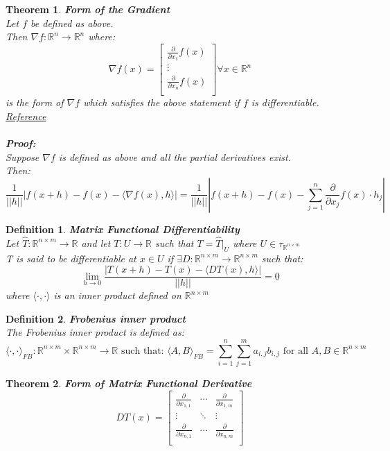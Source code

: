\documentclass[12pt]{extarticle}
\theoremstyle{plain}
\newtheorem{thm}{Theorem}[section]
\theoremstyle{plain}
\theoremstyle{Definition}
\newtheorem{def.}{Definition}[section]
\theoremstyle{Definition}
\theoremstyle{plain}
\begin{document}
\begin{thm} \textbf{Form of the Gradient} \\ 
	Let $f$ be defined as above. \\ 
	Then $\nabla f: \mathbb{R}^n \to \mathbb{R}^n$ where: \\ 
	\[
	\nabla f(x) = 
	\begin{bmatrix}
	\frac{\partial }{\partial x_1}f(x) \\ 
	\vdots \\
	\frac{\partial }{\partial x_n}f(x) \\ 				
	\end{bmatrix}
	\forall x \in \mathbb{R}^n
	\]
	is the form of $\nabla f$ which satisfies the above statement if $f$ is differentiable. \\
	\href{https://en.wikipedia.org/wiki/Gradient}{Reference} \\ \\
	\textbf{Proof:} \\ 
	Suppose $\nabla f$ is defined as above and all the partial derivatives exist. \\ 
	Then: 
	$$\frac{1}{||h||} |f(x + h) - f(x) - \langle \nabla f(x),h \rangle| = \frac{1}{||h||} \left|f(x + h) - f(x) - \sum_{j=1}^n \frac{\partial}{\partial x_j} f(x)\cdot h_j\right|$$
\end{thm}
\newpage
\begin{def.} \textbf{Matrix Functional Differentiability} \\ 
	Let $\hat{T} : \mathbb{R}^{n \times m} \to \mathbb{R}$ and let $T : U \to \mathbb{R}$ such that $T = \hat{T}|_U$ where $U \in \tau_{\mathbb{R}^{n \times m}}$ \\ 
	T is said to be differentiable at $x \in U$ if $\exists D : \mathbb{R}^{n \times m} \to \mathbb{R}^{n \times m}$ such that: \\  
	$$\lim_{h \to 0}\frac{|T(x + h) - T(x) - \langle D T(x),h \rangle|}{||h||} = 0$$
	where $\langle \cdot, \cdot \rangle$ is an inner product defined on $\mathbb{R}^{n \times m}$
\end{def.}
\begin{def.} \textbf{Frobenius inner product} \\
	The Frobenius inner product is defined as: \\ 
	$$\langle \cdot , \cdot \rangle_{FB} : \mathbb{R}^{n \times m} \times \mathbb{R}^{n \times m} \to \mathbb{R} \text{ such that: } \langle A,B \rangle_{FB} = \sum_{i=1}^n \sum_{j=1}^m a_{i,j}b_{i,j} \text{ for all } A,B \in \mathbb{R}^{n \times m}$$
\end{def.}
\begin{thm} \textbf{Form of Matrix Functional Derivative} \\
	\[
	DT(x) = 
	\begin{bmatrix}
	\frac{\partial}{\partial x_{1,1}} & \cdots & \frac{\partial}{\partial x_{1,m}} \\ 
	\vdots & \ddots & \vdots \\
	\frac{\partial}{\partial x_{n,1}} & \cdots & \frac{\partial}{\partial x_{n,m}} \\ 
	\end{bmatrix}	
	\]


\end{thm}
\end{document}
